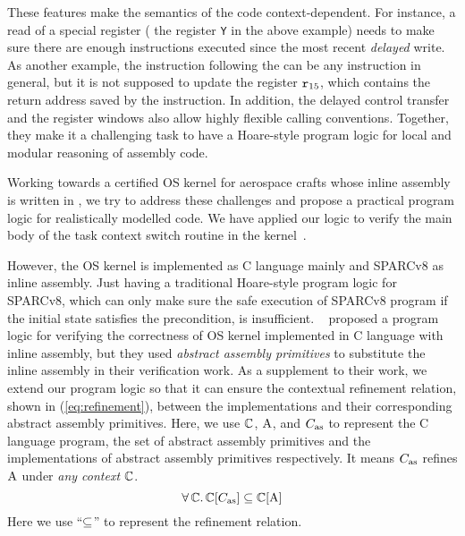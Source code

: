 These features make the semantics of the \sparc{} code
context-dependent. For instance, a read of a special register
(\eg{} the register {\tt Y} in the above example) needs to
make sure there are enough instructions executed since the
most recent {\em delayed} write. As another example,
the instruction following the \call{} can be any
instruction in general, but it is not supposed to
update the register $\texttt{r}_{15}$, which contains the return
address saved by the \call{} instruction.
In addition,
the delayed control transfer
and the register windows also allow highly flexible calling
conventions. Together, they make it a challenging task
to have a Hoare-style program logic for local and modular
reasoning of \sparc{} assembly code.

Working towards a certified OS kernel for aerospace
crafts whose inline assembly is written in \sparc,
we try to address these challenges and propose a practical
program logic for realistically modelled \sparc{} code.
We have applied our logic to verify the main body of
the task context switch routine in the kernel~\cite{zha18aplas}.

However, the OS kernel is implemented as
C language mainly and SPARCv8 as inline assembly.
Just having a traditional Hoare-style
program logic for SPARCv8, which can only make sure
the safe execution of SPARCv8 program if the initial
state satisfies the precondition, is insufficient.
~\cite{Xu16cav} proposed a program logic for
verifying the correctness of OS kernel implemented in
C language with inline assembly,
but they used {\em abstract assembly primitives} to
substitute the inline assembly in their verification work.
As a supplement to their work, we extend our
program logic so that it can ensure the
contextual refinement relation,
shown in (\ref{eq:refinement}),
between the implementations and
their corresponding abstract assembly primitives.
Here, we use $\mathbb{C}$, $\text{A}$,
and $C_{\text{as}}$ to represent the C language program,
the set of abstract assembly
primitives and the implementations of
abstract assembly primitives respectively.
It means $C_{\text{as}}$ refines $\text{A}$ under
\textit{any context} $\mathbb{C}$.
\begin{equation}
    \forall \, \mathbb{C}. \,
    \mathbb{C}[C_{\text{as}}] \subseteq \mathbb{C}[\text{A}]
    \label{eq:refinement}
\end{equation}
%
Here we use ``$\subseteq$'' to represent the refinement
relation.
%

